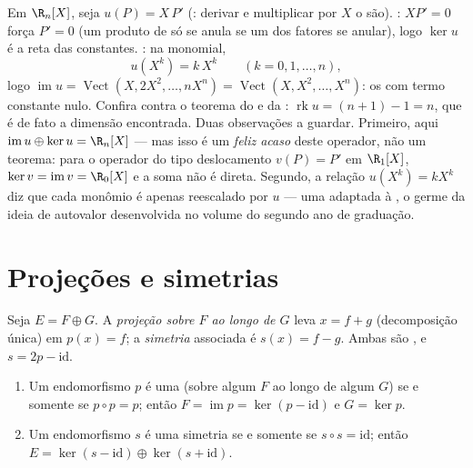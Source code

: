 \begin{example}
\label{ex:b1:linmaps:euler}
Em $\R_n[X]$, seja $u(P) = X\,P'$ (: derivar e multiplicar por $X$ o
são). \emph{}: $XP' = 0$ força $P' = 0$ (um produto de
 só se anula se um dos fatores se anular), logo $\ker u$
é a reta das constantes. \emph{}: na  monomial,
\[
u(X^k) = k\,X^{k} \qquad (k = 0, 1, \dots, n),
\]
logo $\operatorname{im} u = \operatorname{Vect}(X, 2X^2, \dots,
nX^n) = \operatorname{Vect}(X, X^2, \dots, X^n)$: os  com termo constante nulo. Confira contra
o teorema do  e da : $\operatorname{rk} u = (n + 1) - 1 = n$, que é de fato a dimensão
encontrada. Duas observações a guardar. Primeiro, aqui $\operatorname{im} u \oplus \ker u = \R_n[X]$ ---
mas isso é um \emph{feliz acaso} deste operador, não um teorema:
para o operador do tipo deslocamento $v(P) = P'$ em $\R_1[X]$, $\ker v = \operatorname{im}
v = \R_0[X]$ e a
soma não é direta. Segundo, a relação $u(X^k) = kX^k$ diz que cada monômio é
apenas reescalado por $u$ --- uma  adaptada à , o
germe da ideia de autovalor desenvolvida no volume do segundo ano
de graduação.
\end{example}

\section{Projeções e simetrias}

\begin{definition}\label{def:b1:linmaps:projection}
Seja $E = F \oplus G$. A \emph{projeção sobre $F$ ao longo de
$G$} leva $x = f + g$ (decomposição única) em $p(x) = f$; a
\emph{simetria} associada é $s(x)
= f - g$. Ambas são
, e $s = 2p - \mathrm{id}$.
\end{definition}

\begin{theorem}\label{thm:b1:linmaps:projchar}
\begin{enumerate}
  \item Um endomorfismo $p$ é uma  (sobre algum $F$ ao longo
        de algum $G$) se e somente se $p \circ p = p$; então $F =
        \operatorname{im} p = \ker(p - \mathrm{id})$ e $G = \ker
        p$.
  \item Um endomorfismo $s$ é uma simetria se e somente se $s \circ s
        = \mathrm{id}$;
        então $E = \ker(s - \mathrm{id}) \oplus
        \ker(s + \mathrm{id})$.
\end{enumerate}
\end{theorem}

